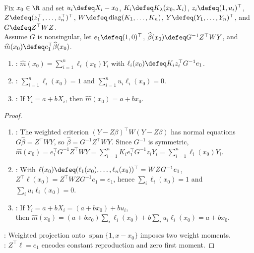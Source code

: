 \begin{proposition} \label{prop:local-linear-equivalent-kernel-moments} \\
Fix $x_0\in\R$ and set $u_i\defeq X_i-x_0$, $K_i\defeq K_\lambda(x_0,X_i)$, $z_i\defeq(1,u_i)^\top$, $Z\defeq(z_1^\top,\ldots,z_n^\top)^\top$, $W\defeq\operatorname{diag}(K_1,\ldots,K_n)$, $Y\defeq(Y_1,\ldots,Y_n)^\top$, and $G\defeq Z^\top WZ$.\\
Assume $G$ is nonsingular, let $e_1\defeq(1,0)^\top$, $\widehat{\beta}(x_0)\defeq G^{-1}Z^\top WY$, and $\widehat{m}(x_0)\defeq e_1^\top\widehat{\beta}(x_0)$.
\begin{enumerate}[label=(\roman*)]
\setlength{\itemsep}{0pt}
\item {}: $\widehat{m}(x_0)=\sum\limits_{i=1}^n\ell_i(x_0)Y_i$ with $\ell_i(x_0)\defeq K_iz_i^\top G^{-1}e_1$.
\item {}: $\sum\limits_{i=1}^n\ell_i(x_0)=1$ and $\sum\limits_{i=1}^nu_i\ell_i(x_0)=0$.
\item {}: If $Y_i=a+bX_i$, then $\widehat{m}(x_0)=a+bx_0$.
\end{enumerate}
\begin{proof}
\begin{enumerate}[label=(\roman*)]
\setlength{\itemsep}{0pt}
\item {}: The weighted criterion $(Y-Z\beta)^\top W(Y-Z\beta)$ has normal equations $G\widehat{\beta}=Z^\top WY$, so $\widehat{\beta}=G^{-1}Z^\top WY$. Since $G^{-1}$ is symmetric, $\widehat{m}(x_0)=e_1^\top G^{-1}Z^\top WY=\sum\limits_{i=1}^nK_ie_1^\top G^{-1}z_iY_i=\sum\limits_{i=1}^n\ell_i(x_0)Y_i$.
\item {}: With $\ell(x_0)\defeq(\ell_1(x_0),\ldots,\ell_n(x_0))^\top=WZG^{-1}e_1$, $Z^\top\ell(x_0)=Z^\top WZG^{-1}e_1=e_1$, hence $\sum\limits_i\ell_i(x_0)=1$ and $\sum\limits_i u_i\ell_i(x_0)=0$.
\item {}: If $Y_i=a+bX_i=(a+bx_0)+bu_i$,\\
then $\widehat{m}(x_0)=(a+bx_0)\sum\limits_i\ell_i(x_0)+b\sum\limits_i u_i\ell_i(x_0)=a+bx_0$.
\end{enumerate}
: Weighted projection onto $\operatorname{span}\{1,x-x_0\}$ imposes two weight moments.\\
: $Z^\top\ell=e_1$ encodes constant reproduction and zero first moment.
\end{proof}
\end{proposition}

